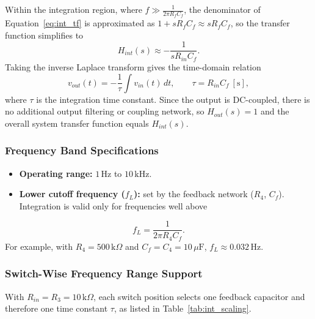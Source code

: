 \documentclass[11pt,a4paper]{article}
\begin{document}
Within the integration region, where $f \gg \frac{1}{2\pi R_fC_f}$, the denominator of Equation~\eqref{eq:int_tf} is approximated as $1 + sR_fC_f \approx sR_fC_f$, so the transfer function simplifies to
\begin{equation}
	H_{int}(s) \approx -\frac{1}{sR_{in}C_f}.
\end{equation}
Taking the inverse Laplace transform gives the time-domain relation
\begin{equation}
	v_{out}(t) = -\frac{1}{\tau}\int v_{in}(t)\,dt, \qquad \tau = R_{in}C_f\ [\text{s}],
	\label{eq:int_time}
\end{equation}
where $\tau$ is the integration time constant. Since the output is DC-coupled, there is no additional output filtering or coupling network, so $H_{out}(s) = 1$ and the overall system transfer function equals $H_{int}(s)$.

\subsubsection{Frequency Band Specifications}
\begin{itemize}
	\item \textbf{Operating range:} $1\,\text{Hz}$ to $10\,\text{kHz}$.
	\item \textbf{Lower cutoff frequency ($f_L$):} set by the feedback network ($R_4$, $C_f$). Integration is valid only for frequencies well above
\end{itemize}
\begin{equation}
	f_L = \frac{1}{2\pi R_4 C_f}.
\end{equation}
For example, with $R_4 = 500\,\text{k}\Omega$ and $C_f = C_4 = 10\,\mu\text{F}$, $f_L \approx 0.032\,\text{Hz}$.

\subsubsection{Switch-Wise Frequency Range Support}

With $R_{in} = R_3 = 10\,\text{k}\Omega$, each switch position selects one feedback capacitor and therefore one time constant $\tau$, as listed in Table~\ref{tab:int_scaling}.
\end{document}
